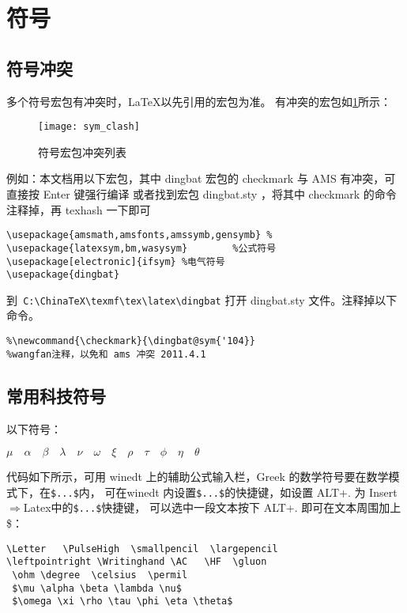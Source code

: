 \section{符号}

\subsection{符号冲突}
多个符号宏包有冲突时，\LaTeX 以先引用的宏包为准。
有冲突的宏包如\ref{sym_clash}所示：

\begin{figure}[ht]
  \centering
  \texttt{[image: sym\_clash]}\\
   \caption{符号宏包冲突列表} \label{sym_clash}
\end{figure}

例如：本文档用以下宏包，其中 dingbat 宏包的 checkmark 与 AMS 有冲突，可直接按 Enter 键强行编译
或者找到宏包 dingbat.sty ，将其中 checkmark 的命令注释掉，再 texhash 一下即可
\begin{shaded}
\begin{verbatim}
\usepackage{amsmath,amsfonts,amssymb,gensymb} %
\usepackage{latexsym,bm,wasysym}        %公式符号
\usepackage[electronic]{ifsym} %电气符号
\usepackage{dingbat}
\end{verbatim}
\end{shaded}
到\verb| C:\ChinaTeX\texmf\tex\latex\dingbat| 打开 dingbat.sty 文件。注释掉以下命令。
\begin{shaded}
\begin{verbatim}
%\newcommand{\checkmark}{\dingbat@sym{'104}}
%wangfan注释，以免和 ams 冲突 2011.4.1
\end{verbatim}
\end{shaded}

\subsection{常用科技符号}
以下符号：
\begin{framed}
\Letter \quad \PulseHigh \quad \smallpencil \quad \largepencil \quad
\leftpointright\quad \Writinghand \quad \AC \quad \HF \quad \gluon \quad
\ohm \quad\degree \quad \celsius \quad \permil \quad

 $\mu \quad \alpha \quad\beta\quad\lambda\quad\nu\quad\omega \quad\xi\quad\rho\quad\tau\quad\phi\quad\eta\quad\theta$
\end{framed}
代码如下所示，可用 winedt 上的辅助公式输入栏，Greek 的数学符号要在数学模式下，在\verb|$...$|内，
可在winedt 内设置\verb|$...$|的快捷键，如设置 ALT+. 为 Insert$\Rightarrow$Latex中的\verb|$...$|快捷键，
可以选中一段文本按下 ALT+. 即可在文本周围加上\$：
\begin{shaded}
\begin{verbatim}
\Letter   \PulseHigh  \smallpencil  \largepencil
\leftpointright \Writinghand \AC   \HF  \gluon
 \ohm \degree  \celsius  \permil
 $\mu \alpha \beta \lambda \nu$
 $\omega \xi \rho \tau \phi \eta \theta$
\end{verbatim}
\end{shaded}

